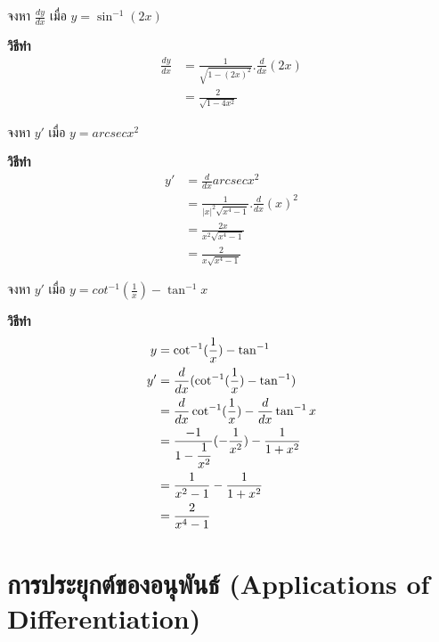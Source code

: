 \documentclass[
]{book}
\begin{document}
จงหา \(\displaystyle \frac{dy}{dx}\) เมื่อ \(y=\sin^{-1}(2x)\)

\textbf{วิธีทำ} \begin{equation}   \begin{aligned}
 \displaystyle
\frac{dy}{dx}&=\frac{1}{\sqrt{1-(2x)^{2}}}.\frac{d}{dx}(2x)\\
&=\frac{2}{\sqrt{1-4x^{2}}}
  \end{aligned} \end{equation}

จงหา \(y'\) เมื่อ \(y=arcsec x^{2}\)

\textbf{วิธีทำ} \begin{equation}   \begin{aligned}
 \displaystyle y'&=\frac{d}{dx}arcsec
x^{2}\\
&=\displaystyle \frac{1}{|x|^{2}\sqrt{x^{4}-1}}.\frac{d}{dx}(x)^{2}\\
&=\displaystyle \frac{2x}{x^{2}\sqrt{x^{4}-1}}\\
&=\displaystyle \frac{2}{x\sqrt{x^{4}-1}}
  \end{aligned} \end{equation}

จงหา \(y'\) เมื่อ \(y=cot^{-1}\displaystyle(\frac{1}{x})-\tan^{-1}x\)

\textbf{วิธีทำ} \begin{equation}   \begin{aligned}
\displaystyle y&=\cot^{-1}(\frac{1}{x})-\tan^{-1}\\
\displaystyle y'&=\frac{d}{dx}(\cot^{-1}(\frac{1}{x})-\tan^{-1})\\
\displaystyle &=\frac{d}{dx}\cot^{-1}(\displaystyle
\frac{1}{x})-\frac{d}{dx}\tan^{-1}x\\
\displaystyle &=\frac{-1}{1-\displaystyle
\frac{1}{x^{2}}}(-\frac{1}{x^{2}})-\frac{1}{1+x^{2}}\\
\displaystyle &=\frac{1}{x^{2}-1}-\frac{1}{1+x^{2}}\\
\displaystyle &=\frac{2}{x^{4}-1}
  \end{aligned} \end{equation}

\chapter{การประยุกต์ของอนุพันธ์ (Applications of
Differentiation)}\label{uxe01uxe32uxe23uxe1buxe23uxe30uxe22uxe01uxe15uxe02uxe2duxe07uxe2duxe19uxe1euxe19uxe18-applications-of-differentiation}
\end{document}
